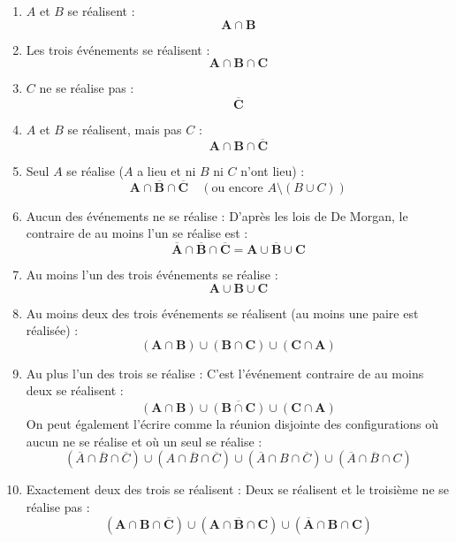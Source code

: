 \documentclass[11pt,a4paper]{article}
\begin{document}
\begin{correctionbox}
\begin{enumerate}[label=\arabic*.]
    \item \og $A$ et $B$ se réalisent \fg{} :
    \[
    \mathbf{A \cap B}
    \]
    \item \og Les trois événements se réalisent \fg{} :
    \[
    \mathbf{A \cap B \cap C}
    \]
    \item \og $C$ ne se réalise pas \fg{} :
    \[
    \mathbf{\overline{C}}
    \]
    \item \og $A$ et $B$ se réalisent, mais pas $C$ \fg{} :
    \[
    \mathbf{A \cap B \cap \overline{C}}
    \]
    \item \og Seul $A$ se réalise \fg{} ($A$ a lieu et ni $B$ ni $C$ n'ont lieu) :
    \[
    \mathbf{A \cap \overline{B} \cap \overline{C}} \quad (\text{ou encore } A \setminus (B \cup C))
    \]
    \item \og Aucun des événements ne se réalise \fg{} :
    D'après les lois de De Morgan, le contraire de \og au moins l'un se réalise \fg{} est :
    \[
    \mathbf{\overline{A} \cap \overline{B} \cap \overline{C} = \overline{A \cup B \cup C}}
    \]
    \item \og Au moins l'un des trois événements se réalise \fg{} :
    \[
    \mathbf{A \cup B \cup C}
    \]
    \item \og Au moins deux des trois événements se réalisent \fg{} (au moins une paire est réalisée) :
    \[
    \mathbf{(A \cap B) \cup (B \cap C) \cup (C \cap A)}
    \]
    \item \og Au plus l'un des trois se réalise \fg{} :
    C'est l'événement contraire de \og au moins deux se réalisent \fg{} :
    \[
    \mathbf{\overline{(A \cap B) \cup (B \cap C) \cup (C \cap A)}}
    \]
    On peut également l'écrire comme la réunion disjointe des configurations où aucun ne se réalise et où un seul se réalise :
    \[
    (\overline{A} \cap \overline{B} \cap \overline{C}) \cup (A \cap \overline{B} \cap \overline{C}) \cup (\overline{A} \cap B \cap \overline{C}) \cup (\overline{A} \cap \overline{B} \cap C)
    \]
    \item \og Exactement deux des trois se réalisent \fg{} :
    Deux se réalisent et le troisième ne se réalise pas :
    \[
    \mathbf{(A \cap B \cap \overline{C}) \cup (A \cap \overline{B} \cap C) \cup (\overline{A} \cap B \cap C)}
    \]
\end{enumerate}
\end{correctionbox}
\end{document}

